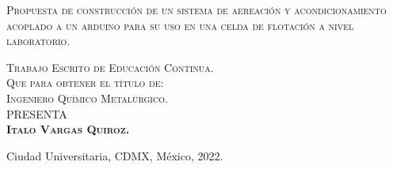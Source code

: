 \documentclass[11pt,letter
								]
								{article}
\begin{document}
\begin{Large}
\begin{titlepage}
\begin{minipage}[c][0.81\textheight][t]{0.75\textwidth}
\begin{center}
                {\Large\scshape Propuesta de construcción de un sistema de aereación  y acondicionamiento acoplado a un arduino para su uso en una celda de flotación a nivel laboratorio.}\\

                \vspace{1.5cm}

                \textsc{\large Trabajo Escrito de Educación Continua.}\\[1cm]
                \textsc{\large Que para obtener el t\'itulo de:}\\[1.5cm]
                \textsc{\LARGE  Ingeniero Químico Metalúrgico.}\\[1.5cm]
                \textsc{\Large P\hspace{1.cm}R\hspace{1.cm}E\hspace{1.cm}S\hspace{1.cm}E\hspace{1.cm}N\hspace{1.cm}T\hspace{1.cm}A}\\[2cm]
                \textsc{\Large {\bfseries Italo Vargas Quiroz.}}\\[1.5cm]

                \vspace{0.5cm}



                {\normalsize Ciudad Universitaria, CDMX, México, 2022. }
            \end{center}
        \end{minipage}
    \end{titlepage}


\end{Large}
\end{document}
